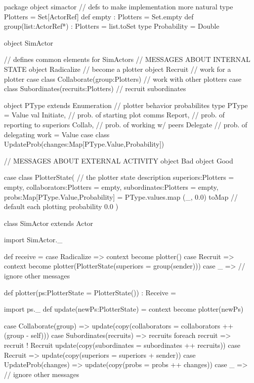 \documentclass{article}
\begin{document}
\begin{code}
package object simactor { // defs to make implementation more natural
  type Plotters = Set[ActorRef]
  def empty : Plotters = Set.empty
  def group(list:ActorRef*) : Plotters = list.toSet
  type Probability = Double
}

object SimActor { // defines common elements for SimActors
  // MESSAGES ABOUT INTERNAL STATE
  object Radicalize                           // become a plotter
  object Recruit                              // work for a plotter
  case class Collaborate(group:Plotters)      // work with other plotters
  case class Subordinates(recruits:Plotters)  // recruit subordinates
  
  object PType extends Enumeration { // plotter behavior probabilites
    type PType = Value
    val Initiate, // prob. of starting plot comms
        Report,   // prob. of reporting to superiors
    	  Collab,	  // prob. of working w/ peers
    	  Delegate  // prob. of delegating work
    		  = Value
  }
  case class UpdateProb(changes:Map[PType.Value,Probability])

  // MESSAGES ABOUT EXTERNAL ACTIVITY
  object Bad
  object Good

  case class PlotterState( // the plotter state description
    superiors:Plotters = empty,
    collaborators:Plotters = empty,
    subordinates:Plotters = empty,
    probs:Map[PType.Value,Probability] = PType.values.map { (_, 0.0) } toMap
    // default each plotting probability 0.0
  )
}

class SimActor extends Actor {
  import SimActor._
  
  def receive = {
    case Radicalize =>
      context become plotter()
    case Recruit =>
      context become plotter(PlotterState(superiors = group(sender)))
    case _ => // ignore other messages
  }
  
  def plotter(ps:PlotterState = PlotterState()) : Receive = {
    import ps._
    def update(newPs:PlotterState) = context become plotter(newPs)
    
    {
       case Collaborate(group) =>
         update(copy(collaborators = collaborators ++ (group - self)))
       case Subordinates(recruits) =>
         recruits foreach { recruit => recruit ! Recruit }
         update(copy(subordinates = subordinates ++ recruits))
       case Recruit =>
         update(copy(superiors = superiors + sender))
       case UpdateProb(changes) =>
         update(copy(probs = probs ++ changes))
       case _ => // ignore other messages
    }
  }
}
\end{code}
\end{document}
